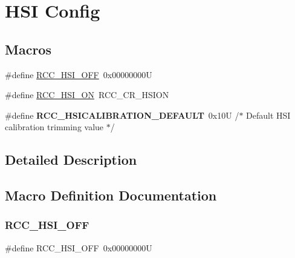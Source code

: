 \hypertarget{group___r_c_c___h_s_i___config}{}\section{H\+SI Config}
\label{group___r_c_c___h_s_i___config}
\subsection*{Macros}
\begin{DoxyCompactItemize}
\item 
\#define \hyperlink{group___r_c_c___h_s_i___config_ga1b34d37d3b51afec0758b3ddc7a7e665}{R\+C\+C\+\_\+\+H\+S\+I\+\_\+\+O\+FF}~0x00000000U
\item 
\#define \hyperlink{group___r_c_c___h_s_i___config_ga0bf09ef9e46d5da25cced7b3122f92f5}{R\+C\+C\+\_\+\+H\+S\+I\+\_\+\+ON}~R\+C\+C\+\_\+\+C\+R\+\_\+\+H\+S\+I\+ON
\item 
\mbox{\label{group___r_c_c___h_s_i___config_ga03cf582e263fb7e31a7783d8adabd7a0}} 
\#define {\bfseries R\+C\+C\+\_\+\+H\+S\+I\+C\+A\+L\+I\+B\+R\+A\+T\+I\+O\+N\+\_\+\+D\+E\+F\+A\+U\+LT}~0x10\+U         /$\ast$ Default H\+S\+I calibration trimming value $\ast$/
\end{DoxyCompactItemize}


\subsection{Detailed Description}


\subsection{Macro Definition Documentation}
\mbox{\label{group___r_c_c___h_s_i___config_ga1b34d37d3b51afec0758b3ddc7a7e665}} 
\subsubsection{\texorpdfstring{R\+C\+C\+\_\+\+H\+S\+I\+\_\+\+O\+FF}{RCC\_HSI\_OFF}}
{\footnotesize\ttfamily \#define R\+C\+C\+\_\+\+H\+S\+I\+\_\+\+O\+FF~0x00000000U}


